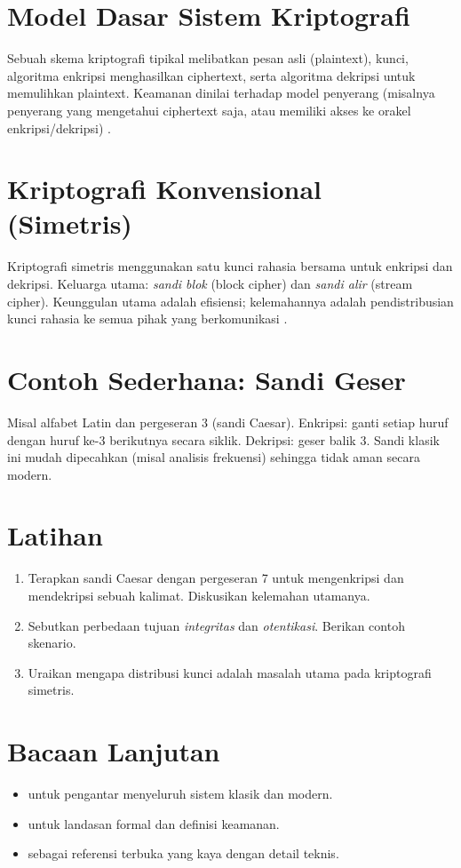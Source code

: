\documentclass[../main.tex]{subfiles}
\begin{document}
\section{Model Dasar Sistem Kriptografi}
Sebuah skema kriptografi tipikal melibatkan pesan asli (plaintext), kunci, algoritma enkripsi menghasilkan ciphertext, serta algoritma dekripsi untuk memulihkan plaintext. Keamanan dinilai terhadap model penyerang (misalnya penyerang yang mengetahui ciphertext saja, atau memiliki akses ke orakel enkripsi/dekripsi) \citep{katzlindell}.

\section{Kriptografi Konvensional (Simetris)}
Kriptografi simetris menggunakan satu kunci rahasia bersama untuk enkripsi dan dekripsi. Keluarga utama: \emph{sandi blok} (block cipher) dan \emph{sandi alir} (stream cipher). Keunggulan utama adalah efisiensi; kelemahannya adalah pendistribusian kunci rahasia ke semua pihak yang berkomunikasi \citep{stallings}.

\section{Contoh Sederhana: Sandi Geser}
Misal alfabet Latin dan pergeseran 3 (sandi Caesar). Enkripsi: ganti setiap huruf dengan huruf ke-3 berikutnya secara siklik. Dekripsi: geser balik 3. Sandi klasik ini mudah dipecahkan (misal analisis frekuensi) sehingga tidak aman secara modern.

\section{Latihan}
\begin{enumerate}
  \item Terapkan sandi Caesar dengan pergeseran 7 untuk mengenkripsi dan mendekripsi sebuah kalimat. Diskusikan kelemahan utamanya.
  \item Sebutkan perbedaan tujuan \emph{integritas} dan \emph{otentikasi}. Berikan contoh skenario.
  \item Uraikan mengapa distribusi kunci adalah masalah utama pada kriptografi simetris.
\end{enumerate}

\section{Bacaan Lanjutan}
\begin{itemize}
  \item \citep{stallings} untuk pengantar menyeluruh sistem klasik dan modern.
  \item \citep{katzlindell} untuk landasan formal dan definisi keamanan.
  \item \citep{menezes} sebagai referensi terbuka yang kaya dengan detail teknis.
\end{itemize}
\end{document}
